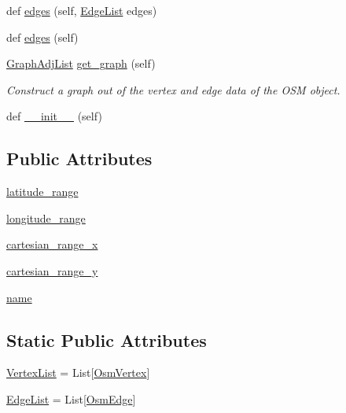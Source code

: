 \begin{DoxyCompactItemize}
def \mbox{\hyperlink{classbridges_1_1data__src__dependent_1_1osm_1_1_osm_data_a601684749b7fd04859418332f5c145f7}{edges}} (self, \mbox{\hyperlink{classbridges_1_1data__src__dependent_1_1osm_1_1_osm_data_a18b0ef38dba7bedcddd29d38d71d91d2}{Edge\+List}} edges)
\item 
def \mbox{\hyperlink{classbridges_1_1data__src__dependent_1_1osm_1_1_osm_data_a1ec1018524a570304e80fb662e266f12}{edges}} (self)
\item 
\mbox{\hyperlink{classbridges_1_1graph__adj__list_1_1_graph_adj_list}{Graph\+Adj\+List}} \mbox{\hyperlink{classbridges_1_1data__src__dependent_1_1osm_1_1_osm_data_ad8f8354c07a6825e24a8d221ca661c00}{get\+\_\+graph}} (self)
\begin{DoxyCompactList}\small\item\em Construct a graph out of the vertex and edge data of the O\+SM object. \end{DoxyCompactList}\item 
def \mbox{\hyperlink{classbridges_1_1data__src__dependent_1_1osm_1_1_osm_data_ab36ec2f4933157aed6c28a02b258afee}{\+\_\+\+\_\+init\+\_\+\+\_\+}} (self)
\end{DoxyCompactItemize}
\subsection*{Public Attributes}
\begin{DoxyCompactItemize}
\item 
\mbox{\hyperlink{classbridges_1_1data__src__dependent_1_1osm_1_1_osm_data_a88caf10c4151c04822cb66af364fd45d}{latitude\+\_\+range}}
\item 
\mbox{\hyperlink{classbridges_1_1data__src__dependent_1_1osm_1_1_osm_data_a7745c671626fb8e97532ff8a9097a780}{longitude\+\_\+range}}
\item 
\mbox{\hyperlink{classbridges_1_1data__src__dependent_1_1osm_1_1_osm_data_a81e77104409461472dcaa68e68eb23da}{cartesian\+\_\+range\+\_\+x}}
\item 
\mbox{\hyperlink{classbridges_1_1data__src__dependent_1_1osm_1_1_osm_data_a5eb0046aadd6da88ca4cac617b054eb3}{cartesian\+\_\+range\+\_\+y}}
\item 
\mbox{\hyperlink{classbridges_1_1data__src__dependent_1_1osm_1_1_osm_data_adb5034420cd207bec97d80fab5e5be3a}{name}}
\end{DoxyCompactItemize}
\subsection*{Static Public Attributes}
\begin{DoxyCompactItemize}
\item 
\mbox{\hyperlink{classbridges_1_1data__src__dependent_1_1osm_1_1_osm_data_aa2bc633ab0d64a560165a1d55cc1f3a4}{Vertex\+List}} = List\mbox{[}\mbox{\hyperlink{classbridges_1_1data__src__dependent_1_1osm_1_1_osm_vertex}{Osm\+Vertex}}\mbox{]}
\item 
\mbox{\hyperlink{classbridges_1_1data__src__dependent_1_1osm_1_1_osm_data_a18b0ef38dba7bedcddd29d38d71d91d2}{Edge\+List}} = List\mbox{[}\mbox{\hyperlink{classbridges_1_1data__src__dependent_1_1osm_1_1_osm_edge}{Osm\+Edge}}\mbox{]}
\end{DoxyCompactItemize}


